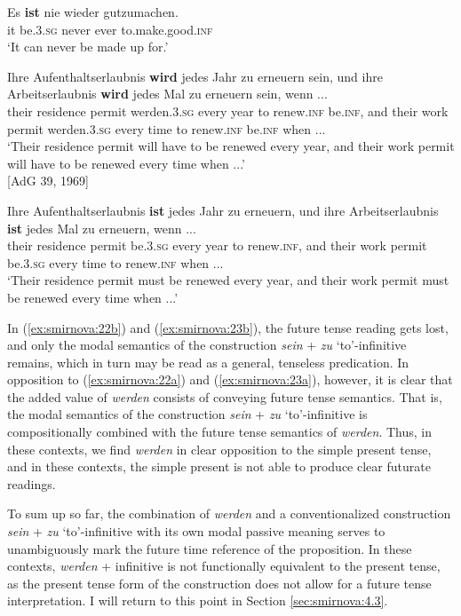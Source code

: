 \documentclass[output=paper,colorlinks,citecolor=brown]{langscibook}
\begin{document}
\ex\label{ex:smirnova:22b}
\gll Es \textbf{ist} nie wieder gutzumachen.\\
it be.\textsc{3.sg} never ever {to.make.good}.\textsc{inf} \\
\glt `It can never be made up for.'
    \z
\z

\ea\label{ex:smirnova:23}
\ea\label{ex:smirnova:23a}
\gll Ihre Aufenthaltserlaubnis \textbf{wird} jedes Jahr zu erneuern sein, und ihre Arbeitserlaubnis \textbf{wird} jedes Mal zu erneuern sein, wenn ... \\
    their {residence permit} werden.\textsc{3.sg} every year to renew.\textsc{inf}  be.\textsc{inf}, and their {work permit} werden.\textsc{3.sg} every time to renew.\textsc{inf}  be.\textsc{inf} when ...\\
\glt `Their residence permit will have to be renewed every year, and their work permit will have to be renewed every time when ...'\\
\hfill [AdG 39, 1969]

\ex\label{ex:smirnova:23b}
\gll Ihre Aufenthaltserlaubnis \textbf{ist} jedes Jahr zu erneuern, und ihre Arbeitserlaubnis \textbf{ist} jedes Mal zu erneuern, wenn ...\\
their {residence permit} be.\textsc{3.sg} every year to renew.\textsc{inf}, and their {work permit} be.\textsc{3.sg} every time to renew.\textsc{inf} when ...\\
\glt `Their residence permit must be renewed every year, and their work permit must be renewed every time when ...'
    \z
\z

In (\ref{ex:smirnova:22b}) and (\ref{ex:smirnova:23b}), the future tense reading gets lost, and only the modal semantics of the construction \emph{sein} + \emph{zu} `to'-infinitive remains, which in turn may be read as a general, tenseless predication. In opposition to (\ref{ex:smirnova:22a}) and (\ref{ex:smirnova:23a}), however, it is clear that the added value of \emph{werden} consists of conveying future tense semantics. That is, the modal semantics of the construction \emph{sein} + \emph{zu} `to'-infinitive is compositionally combined with the future tense semantics of \emph{werden}. Thus, in these contexts, we find \emph{werden} in clear opposition to the simple present tense, and in these contexts, the simple present is not able to produce clear futurate readings.
\par To sum up so far, the combination of \emph{werden} and a conventionalized construction \emph{sein} + \emph{zu} `to'-infinitive with its own modal passive meaning serves to unambiguously mark the future time reference of the proposition. In these contexts, \emph{werden} + infinitive is not functionally equivalent to the present tense, as the present tense form of the construction does not allow for a future tense interpretation. I will return to this point in Section \ref{sec:smirnova:4.3}.
\end{document}
